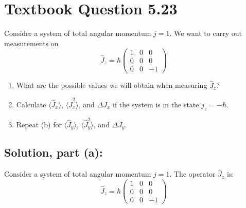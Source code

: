 \documentclass[12pt]{article}
\begin{document}
\section{Textbook Question 5.23}
    Consider a system of total angular momentum $j = 1$. We want to carry out measurements on
    \[
        \hat{J}_z = \hbar \begin{pmatrix}
        1 & 0 & 0 \\
        0 & 0 & 0 \\
        0 & 0 & -1
        \end{pmatrix}
    \]

    \begin{enumerate}
      \item[(a)] What are the possible values we will obtain when measuring $\hat{J}_z$?
      \item[(b)] Calculate $\langle \hat{J}_x \rangle$, $\langle \hat{J}_x^2 \rangle$, and $\Delta J_x$ if the system is in the state $j_z = -\hbar$.
      \item[(c)] Repeat (b) for $\langle \hat{J}_y \rangle$, $\langle \hat{J}_y^2 \rangle$, and $\Delta J_y$.
    \end{enumerate}

    \subsection{Solution, part (a):}
        Consider a system of total angular momentum $j = 1$. The operator $\hat{J}_z$ is:
        \[
            \hat{J}_z = \hbar \begin{pmatrix} 1 & 0 & 0 \\ 0 & 0 & 0 \\ 0 & 0 & -1 \end{pmatrix}
        \]
\end{document}
